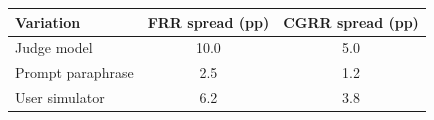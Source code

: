 \begin{tabular}{lcc}
\toprule
Variation & FRR spread (pp) & CGRR spread (pp) \\
\midrule
Judge model & 10.0 & 5.0 \\
Prompt paraphrase & 2.5 & 1.2 \\
User simulator & 6.2 & 3.8 \\
\bottomrule
\end{tabular}